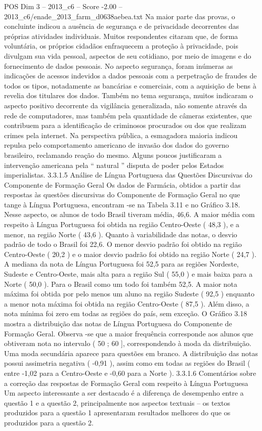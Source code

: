 \begin{textsample}{POS Dim 3 – 2013\_c6 – Score -2.00 – 2013\_c6/enade\_2013\_farm\_d0638aebea.txt}
Na maior parte das provas, o concluinte indicou a ausência de segurança e de privacidade decorrentes das próprias atividades individuais.
Muitos respondentes citaram que, de forma voluntária, os próprios cidadãos enfraquecem a proteção à privacidade, pois divulgam sua vida pessoal, aspectos de seu cotidiano, por meio de imagens e do fornecimento de dados pessoais.
No aspecto segurança, foram inúmeras as indicações de acessos indevidos a dados pessoais com a perpetração de fraudes de todos os tipos, notadamente as bancárias e comerciais, com a aquisição de bens à revelia dos titulares dos dados.
Também no tema segurança, muitos indicaram o aspecto positivo decorrente da vigilância generalizada, não somente através da rede de computadores, mas também pela quantidade de câmeras existentes, que contribuem para a identificação de criminosos procurados ou dos que realizam crimes pela internet.
Na perspectiva pública, a esmagadora maioria indicou repulsa pelo comportamento americano de invasão dos dados do governo brasileiro, reclamando reação do mesmo.
Alguns poucos justificaram a intervenção americana pela “ natural ” disputa de poder pelos Estados imperialistas. 3.3.1.5 Análise de Língua Portuguesa das Questões Discursivas do Componente de Formação Geral Os dados de Farmácia, obtidos a partir das respostas às questões discursivas do Componente de Formação Geral no que tange à Língua Portuguesa, encontram -se na Tabela 3.11 e no Gráfico 3.18.
Nesse aspecto, os alunos de todo Brasil tiveram média, 46,6.
A maior média com respeito à Língua Portuguesa foi obtida na região Centro-Oeste ( 48,3 ), e a menor, na região Norte ( 43,6 ).
Quanto à variabilidade das notas, o desvio padrão de todo o Brasil foi 22,6.
O menor desvio padrão foi obtido na região Centro-Oeste ( 20,2 ) e o maior desvio padrão foi obtido na região Norte ( 24,7 ).
A mediana da nota de Língua Portuguesa foi 52,5 para as regiões Nordeste, Sudeste e Centro-Oeste, mais alta para a região Sul ( 55,0 ) e mais baixa para a Norte ( 50,0 ).
Para o Brasil como um todo foi também 52,5.
A maior nota máxima foi obtida por pelo menos um aluno na região Sudeste ( 92,5 ) enquanto a menor nota máxima foi obtida na região Centro-Oeste ( 87,5 ).
Além disso, a nota mínima foi zero em todas as regiões do país, sem exceção.
O Gráfico 3.18 mostra a distribuição das notas de Língua Portuguesa do Componente de Formação Geral.
Observa -se que a maior frequência corresponde aos alunos que obtiveram nota no intervalo ( 50 ; 60 ], correspondendo à moda da distribuição.
Uma moda secundária aparece para questões em branco.
A distribuição das notas possui assimetria negativa ( -0,91 ), assim como em todas as regiões do Brasil ( entre -1,02 para a Centro-Oeste e -0,60 para a Norte ). 3.3.1.6 Comentários sobre a correção das respostas de Formação Geral com respeito à Língua Portuguesa Um aspecto interessante a ser destacado é a diferença de desempenho entre a questão 1 e a questão 2, principalmente nos aspectos textuais – os textos produzidos para a questão 1 apresentaram resultados melhores do que os produzidos para a questão 2.

\end{textsample}
